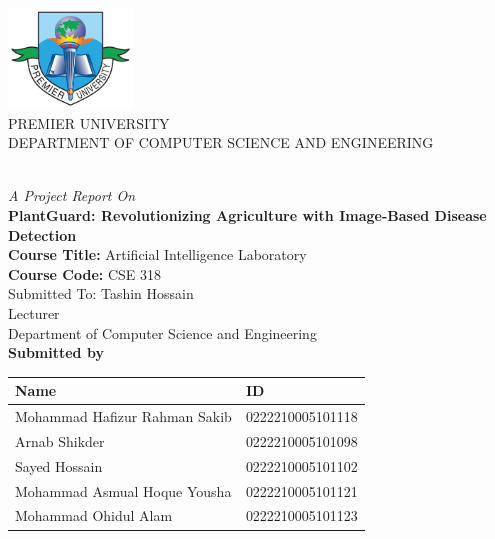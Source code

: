 
\thispagestyle{empty} %



{
	\thispagestyle{empty}
	\centering
	\normalsize
	  
        \includegraphics[width=1.3in]{Images/PUClogo.png}\\

	{PREMIER UNIVERSITY}\\
	{DEPARTMENT OF COMPUTER SCIENCE AND ENGINEERING}\\
	
	\\[1.5cm]
	{\textit{A Project Report On}\\
	{\bf PlantGuard: Revolutionizing Agriculture with Image-Based Disease Detection}\\[1.5cm]

     {\bf Course Title:} Artificial Intelligence Laboratory\\
     {\bf Course Code:}  CSE 318\\[1.5cm]

        Submitted To: 
          Tashin Hossain\\
          Lecturer \\
          Department of Computer Science and Engineering\\[1.5cm]
    

        \large
    \textbf {Submitted by}\\
    \begin{center}
        \renewcommand{\arraystretch}{1.5} %
        \begin{tabular}{|>{\raggedright\arraybackslash}p{}|p{}|} %
        \hline
        \textbf{Name} & \textbf{ID} \\
        \hline
        Mohammad Hafizur Rahman Sakib & 0222210005101118 \\
        \hline
        Arnab Shikder & 0222210005101098 \\
        \hline
        Sayed Hossain & 0222210005101102 \\
        \hline
        Mohammad Asmual Hoque Yousha & 0222210005101121 \\
        \hline
         Mohammad Ohidul Alam & 0222210005101123 \\
        \hline
        \end{tabular}
        \end{center}
    \vspace{0.5in}
	
}

}

